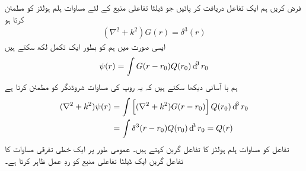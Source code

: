 فرض کریں ہم ایک تفاعل  دریافت کر پائیں جو ڈیلٹا تفاعلی منبع کے لئے مساوات ہلم ہولٹز کو مطمئن کرتا ہو
\begin{align}
	(\nabla^2+k^2)G(r)=\delta^3(r)
\end{align}
ایسی صورت میں ہم  کو بطور ایک تکمل لکھ سکتے ہیں
\begin{align}
	\psi(r)=\int G(r-r_0)Q(r_0)\dif^3r_0
\end{align}
ہم با آسانی دیکھا سکتے ہیں کہ یہ  روپ کی مساوات شروڈنگر کو مطمئن کرتا ہے
\begin{align*}
	(\nabla^2+k^2)\psi(r) &= \int\left[(\nabla^2+k^2)G(r-r_0)\right]Q(r_0)\dif^3r_0 \\
	&= \int\delta^3(r-r_0)Q(r_0)\dif^3r_0 = Q(r)
\end{align*}
تفاعل  کو مساوات ہلم ہولٹز کا تفاعل گرین کہتے ہیں۔ عمومی طور پر ایک خطی تفرقی مساوات کا تفاعل گرین ایک ڈیلٹا تفاعلی منبع کو ردِ عمل ظاہر کرتا ہے۔

